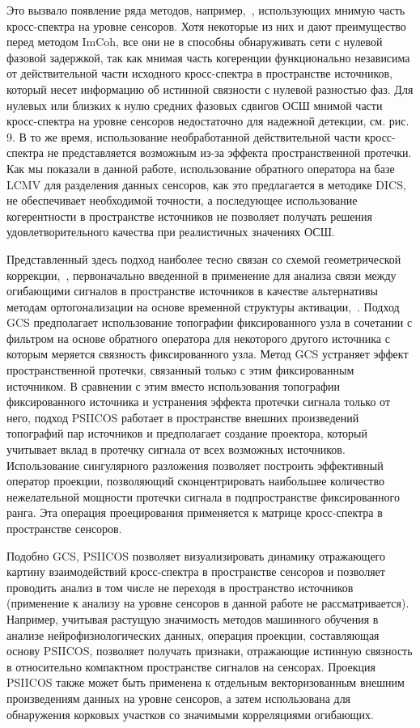 Это вызвало появление ряда методов, например,~\cite{PLI, wPLI, wedgemusic},
использующих мнимую часть кросс-спектра на уровне сенсоров.
Хотя некоторые из них и дают преимущество перед методом ImCoh, все
они не в способны обнаруживать сети с нулевой фазовой задержкой, так как мнимая
часть когеренции функционально независима от действительной части исходного
кросс-спектра в пространстве источников, который несет информацию об истинной
связности с нулевой разностью фаз. Для нулевых или близких к нулю средних
фазовых сдвигов ОСШ мнимой части кросс-спектра на уровне сенсоров недостаточно
для надежной детекции, см. рис. 9. В то же время, использование необработанной
действительной части кросс-спектра не представляется возможным из-за эффекта
пространственной протечки. Как мы показали в данной работе, использование
обратного оператора на базе LCMV для разделения данных сенсоров, как это
предлагается в методике DICS, не обеспечивает необходимой точности, а
последующее использование когерентности в пространстве
источников не позволяет получать решения удовлетворительного качества при
реалистичных значениях ОСШ.

Представленный здесь подход наиболее тесно связан со схемой геометрической
коррекции,~\cite{Wens2015}, первоначально введенной в применение для анализа
связи между огибающими сигналов в пространстве источников в качестве
альтернативы методам ортогонализации на основе временной структуры
активации,~\cite{Hipp2012, Colclough2015}. Подход GCS предполагает
использование топографии фиксированного узла в сочетании с фильтром на основе
обратного оператора для некоторого другого источника с которым меряется
связность фиксированного узла. Метод GCS устраняет эффект пространственной
протечки, связанный только с этим фиксированным источником.  В сравнении с этим
вместо использования топографии фиксированного источника и устранения эффекта
протечки сигнала только от него, подход PSIICOS работает в пространстве внешних
произведений топографий пар источников и предполагает создание проектора,
который учитывает вклад в протечку сигнала от всех возможных источников.
Использование сингулярного разложения позволяет построить эффективный оператор
проекции, позволяющий сконцентрировать наибольшее количество нежелательной
мощности протечки сигнала в подпространстве фиксированного ранга. Эта операция
проецирования применяется к матрице кросс-спектра в пространстве сенсоров.

Подобно GCS, PSIICOS позволяет визуализировать динамику отражающего картину
взаимодействий кросс-спектра в пространстве сенсоров и позволяет проводить
анализ в том числе не переходя в пространство источников (применение к анализу
на уровне сенсоров в данной работе не рассматривается). Например, учитывая
растущую значимость методов машинного обучения в анализе нейрофизиологических
данных, операция проекции, составляющая основу PSIICOS, позволяет получать
признаки, отражающие истинную связность в относительно компактном пространстве
сигналов на сенсорах. Проекция PSIICOS также может быть применена к отдельным
векторизованным внешним произведениям данных на уровне сенсоров, а затем
использована для обнаружения корковых участков со значимыми корреляциями
огибающих.

